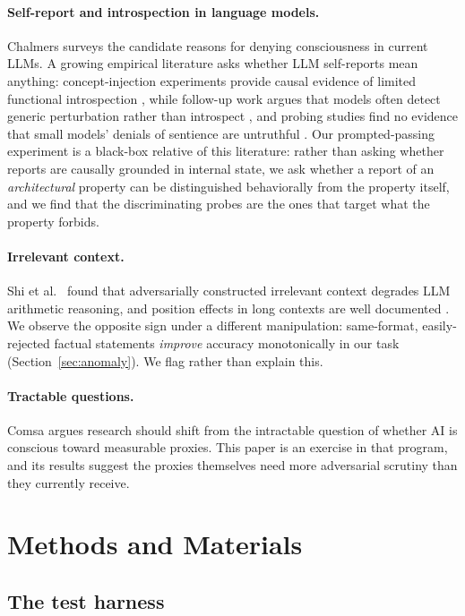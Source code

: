 \documentclass[11pt]{article}
\begin{document}
\paragraph{Self-report and introspection in language models.}
Chalmers \cite{chalmers2023} surveys the candidate reasons for denying
consciousness in current LLMs. A growing empirical literature asks whether LLM
self-reports mean anything: concept-injection experiments provide causal evidence
of limited functional introspection \cite{lindsey2025}, while follow-up work
argues that models often detect generic perturbation rather than introspect
\cite{singh2026}, and probing studies find no evidence that small models'
denials of sentience are untruthful \cite{kaiser2026}. Our prompted-passing experiment is a
black-box relative of this literature: rather than asking whether reports are
causally grounded in internal state, we ask whether a report of an
\emph{architectural} property can be distinguished behaviorally from the property
itself, and we find that the discriminating probes are the ones that target what
the property forbids.

\paragraph{Irrelevant context.}
Shi et al.\ \cite{shi2023} found that adversarially constructed irrelevant context
degrades LLM arithmetic reasoning, and position effects in long contexts are well
documented \cite{liu2024}. We observe the opposite sign under a different
manipulation: same-format, easily-rejected factual statements \emph{improve}
accuracy monotonically in our task (Section~\ref{sec:anomaly}). We flag rather
than explain this.

\paragraph{Tractable questions.}
Comsa \cite{comsa2026} argues research should shift from the intractable question
of whether AI is conscious toward measurable proxies. This paper is an exercise in
that program, and its results suggest the proxies themselves need more adversarial
scrutiny than they currently receive.

\section{Methods and Materials}
\label{sec:methods}

\subsection{The test harness}
\label{sec:harness}
\end{document}
